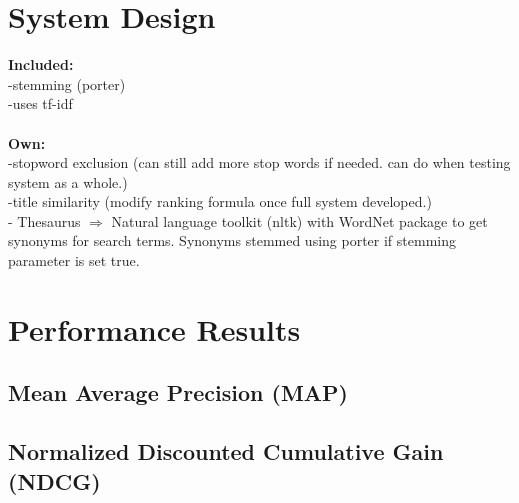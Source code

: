 \documentclass[11pt]{article}
\begin{document}


\section{System Design}
\textbf{Included:}
\\-stemming (porter)
\\-uses tf-idf
\\\\\textbf{Own:}
\\-stopword exclusion (can still add more stop words if needed. can do when testing system as a whole.)
\\-title similarity (modify ranking formula once full system developed.)
\\- Thesaurus $\Rightarrow$ Natural language toolkit (nltk) with WordNet package to get synonyms for search terms. Synonyms stemmed using porter if stemming parameter is set true.


\section{Performance Results}
\subsection{Mean Average Precision (MAP)}
\subsection{Normalized Discounted Cumulative Gain (NDCG)}
%
%
\end{document}
